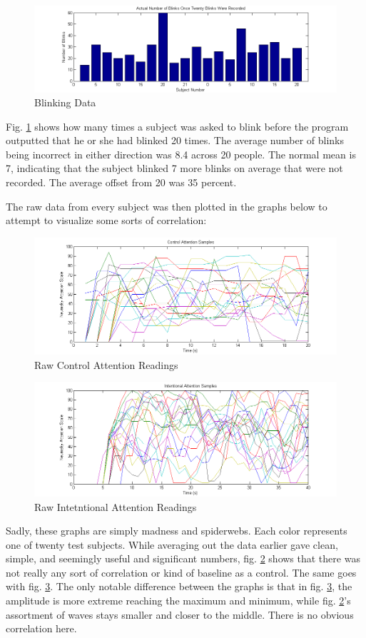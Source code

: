 \documentclass[journal]{IEEEtran}
\begin{document}
\begin{figure}[H]
    \centering
    \includegraphics[width=.5\textwidth]{EEG/Actual_blinks_graph}
    \caption{Blinking Data}
    \label{blinking}
\end{figure} 

Fig. \ref{blinking} shows how many times a subject was asked to blink before the program outputted that he or she had blinked 20 times. The average number of blinks being incorrect in either direction was 8.4 across 20 people. The normal mean is 7, indicating that the subject blinked 7 more blinks on average that were not recorded. The average offset from 20 was 35 percent. \par

The raw data from every subject was then plotted in the graphs below to attempt to visualize some sorts of correlation: \par

\begin{figure}[H]
    \centering
    \includegraphics[width=.5\textwidth]{EEG/all_attentions_control}
    \caption{Raw Control Attention Readings}
    \label{a_a_c}
\end{figure} 

\begin{figure}[H]
    \centering
    \includegraphics[width=.5\textwidth]{EEG/all_attentions_intentional}
    \caption{Raw Intetntional Attention Readings}
    \label{a_a_i}
\end{figure} 


Sadly, these graphs are simply madness and spiderwebs. Each color represents one of twenty test subjects. While averaging out the data earlier gave clean, simple, and seemingly useful and significant numbers, fig. \ref{a_a_c} shows that there was not really any sort of correlation or kind of baseline as a control. The same goes with fig. \ref{a_a_i}. The only notable difference between the graphs is that in fig. \ref{a_a_i}, the amplitude is more extreme reaching the maximum and minimum, while fig. \ref{a_a_c}'s assortment of waves stays smaller and closer to the middle. There is no obvious correlation here. \par
\end{document}
